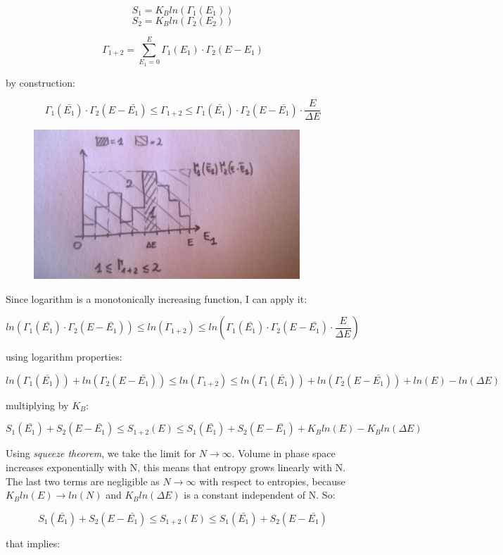 \documentclass[a4paper, italian, openany]{book}
\begin{document}
$$S_1 = K_B ln(\Gamma_1(E_1))$$
$$S_2 = K_B ln(\Gamma_2(E_2))$$

$$\Gamma_{1+2} = \sum_{E_1=0}^{E} \Gamma_1(E_1) \cdot \Gamma_2(E-E_1)$$

by construction:

$$\Gamma_1(\bar{E_1})\cdot \Gamma_2(E- \bar{E_1}) \le \Gamma_{1+2} \le \Gamma_1(\bar{E_1})\cdot \Gamma_2(E-\bar{E_1}) \cdot \frac{E}{\Delta E}$$

\begin{figure}[H]
\centering
\includegraphics[width=100mm]{img/figure5.jpg}
\end{figure}

Since logarithm is a monotonically increasing function, I can apply it:

$$ln(\Gamma_1(\bar{E_1})\cdot \Gamma_2(E- \bar{E_1})) \le ln(\Gamma_{1+2}) \le ln(\Gamma_1(\bar{E_1})\cdot \Gamma_2(E-\bar{E_1}) \cdot \frac{E}{\Delta E})$$

using logarithm properties:

$$ln(\Gamma_1(\bar{E_1})) + ln(\Gamma_2(E- \bar{E_1})) \le ln(\Gamma_{1+2}) \le ln(\Gamma_1(\bar{E_1})) + ln(\Gamma_2(E-\bar{E_1})) + ln(E) - ln(\Delta E)$$

multiplying by $K_B$:

$$S_1(\bar{E_1}) + S_2(E-\bar{E_1}) \le S_{1+2}(E) \le S_1(\bar{E_1}) + S_2(E-\bar{E_1}) + K_B ln(E) - K_B ln(\Delta E)$$

Using \textit{squeeze theorem}, we take the limit for $N \to \infty$. Volume in phase space increases exponentially with N, this means that entropy grows linearly with N. The last two terms are negligible as $N \to \infty$ with respect to entropies, because $K_B ln(E) \to ln(N)$ and $K_B ln(\Delta E)$ is a constant independent of N. So:

$$S_1(\bar{E_1}) + S_2(E-\bar{E_1}) \le S_{1+2}(E) \le S_1(\bar{E_1}) + S_2(E-\bar{E_1})$$

that implies:
\end{document}
